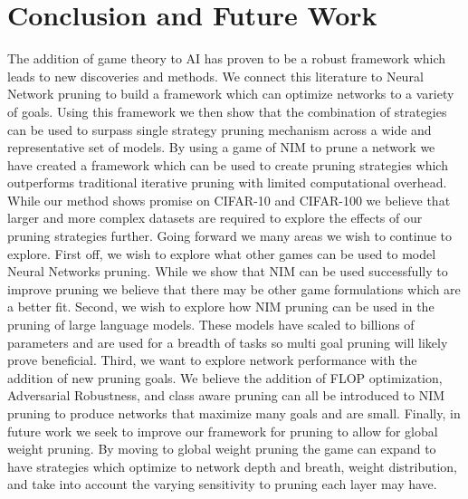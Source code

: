 \documentclass[11pt]{article}
\begin{document}
\section{Conclusion and Future Work}
The addition of game theory to AI has proven to be a robust framework which leads to new discoveries and methods. We connect this literature to Neural Network pruning to build a framework which can optimize networks to a variety of goals. Using this framework we then show that the combination of strategies can be used to surpass single strategy pruning mechanism across a wide and representative set of models. By using a game of NIM to prune a network we have created a framework which can be used to create pruning strategies which outperforms traditional iterative pruning with limited computational overhead. While our method shows promise on CIFAR-10 and CIFAR-100 we believe that larger and more complex datasets are required to explore the effects of our pruning strategies further.
Going forward we many areas we wish to continue to explore. First off, we wish to explore what other games can be used to model Neural Networks pruning. While we show that NIM can be used successfully to improve pruning we believe that there may be other game formulations which are a better fit. Second, we wish to explore how NIM pruning can be used in the pruning of large language models. These models have scaled to billions of parameters and are used for a breadth of tasks so multi goal pruning will likely prove beneficial. Third, we want to explore network performance with the addition of new pruning goals. We believe the addition of FLOP optimization, Adversarial Robustness, and class aware pruning can all be introduced to NIM pruning to produce networks that maximize many goals and are small. Finally, in future work we seek to improve our framework for pruning to allow for global weight pruning. By moving to global weight pruning the game can expand to have strategies which optimize to network depth and breath, weight distribution, and take into account the varying sensitivity to pruning each layer may have. 


\end{document}
